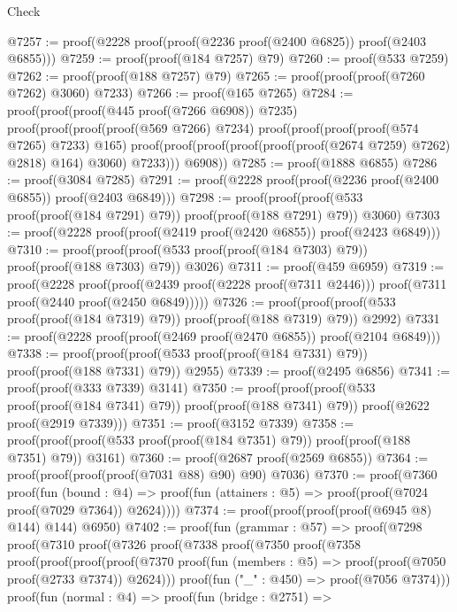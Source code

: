 \begin{lexlean}{Check}
\begin{coremodule}
@7257 := proof(@2228 proof(proof(@2236 proof(@2400 @6825)) proof(@2403 @6855)))
@7259 := proof(proof(@184 @7257) @79)
@7260 := proof(@533 @7259)
@7262 := proof(proof(@188 @7257) @79)
@7265 := proof(proof(proof(@7260 @7262) @3060) @7233)
@7266 := proof(@165 @7265)
@7284 := proof(proof(proof(@445 proof(@7266 @6908)) @7235)
      proof(proof(proof(proof(@569 @7266) @7234)
            proof(proof(proof(proof(@574 @7265) @7233) @165)
                proof(proof(proof(proof(proof(proof(@2674 @7259) @7262) @2818) @164) @3060) @7233)))
          @6908))
@7285 := proof(@1888 @6855)
@7286 := proof(@3084 @7285)
@7291 := proof(@2228 proof(proof(@2236 proof(@2400 @6855)) proof(@2403 @6849)))
@7298 := proof(proof(proof(@533 proof(proof(@184 @7291) @79)) proof(proof(@188 @7291) @79)) @3060)
@7303 := proof(@2228 proof(proof(@2419 proof(@2420 @6855)) proof(@2423 @6849)))
@7310 := proof(proof(proof(@533 proof(proof(@184 @7303) @79)) proof(proof(@188 @7303) @79)) @3026)
@7311 := proof(@459 @6959)
@7319 := proof(@2228
      proof(proof(@2439 proof(@2228 proof(@7311 @2446)))
          proof(@7311 proof(@2440 proof(@2450 @6849)))))
@7326 := proof(proof(proof(@533 proof(proof(@184 @7319) @79)) proof(proof(@188 @7319) @79)) @2992)
@7331 := proof(@2228 proof(proof(@2469 proof(@2470 @6855)) proof(@2104 @6849)))
@7338 := proof(proof(proof(@533 proof(proof(@184 @7331) @79)) proof(proof(@188 @7331) @79)) @2955)
@7339 := proof(@2495 @6856)
@7341 := proof(proof(@333 @7339) @3141)
@7350 := proof(proof(proof(@533 proof(proof(@184 @7341) @79)) proof(proof(@188 @7341) @79))
      proof(@2622 proof(@2919 @7339)))
@7351 := proof(@3152 @7339)
@7358 := proof(proof(proof(@533 proof(proof(@184 @7351) @79)) proof(proof(@188 @7351) @79)) @3161)
@7360 := proof(@2687 proof(@2569 @6855))
@7364 := proof(proof(proof(proof(@7031 @88) @90) @90) @7036)
@7370 := proof(@7360
      proof(fun (bound : @4) =>
        proof(fun (attainers : @5) => proof(proof(@7024 proof(@7029 @7364)) @2624))))
@7374 := proof(proof(proof(proof(@6945 @8) @144) @144) @6950)
@7402 := proof(fun (grammar : @57) =>
    proof(@7298
        proof(@7310
            proof(@7326
                proof(@7338
                    proof(@7350
                        proof(@7358
                            proof(proof(proof(proof(@7370
                                      proof(fun (members : @5) =>
                                        proof(proof(@7050 proof(@2733 @7374)) @2624)))
                                    proof(fun ("_" : @450) => proof(@7056 @7374)))
                                  proof(fun (normal : @4) =>
                                    proof(fun (bridge : @2751) =>

\end{coremodule}
\end{lexlean}
